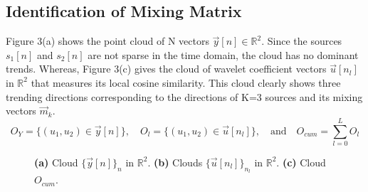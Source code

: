 \documentclass[a4paper,11pt]{article}
\begin{document}
\subsection{Identification of Mixing Matrix}
Figure 3(a) shows the point cloud of N vectors $\vec{y}[n] \in \mathbb{R}^{2}$. Since the sources $s_1[n]$ and $s_2[n]$ are not sparse in the time domain, the cloud has no dominant trends. 
Whereas, Figure 3(c) gives the cloud of  wavelet coefficient vectors $\vec{u}[n_l]$ in $ \mathbb{R}^{2} $ that measures its local cosine similarity. This cloud clearly shows three trending directions corresponding to the directions of K=3 sources and its mixing vectors $\vec{m}_k$.
\\
\[
    O_Y = \{(u_1, u_2) \in \vec{y}[n]\}, \quad
    O_l = \{(u_1, u_2) \in \vec{u}[n_l]\}, \quad \textrm{and} \quad O_{cum} = \sum \limits _{{l=0 }}^{L} O_l
\]
\begin{figure}[H]
    \centering
    \caption{\textbf{(a)} Cloud $\{\vec{y}[n]\}_n$ in $ \mathbb{R}^{2}$. \textbf{(b)} Clouds $\{\vec{u}[n_l]\}_{n_l}$ in $ \mathbb{R}^{2}$. \textbf{(c)} Cloud $O_{cum}$.}
    \label{fig:foobar}
\end{figure}
\end{document}
